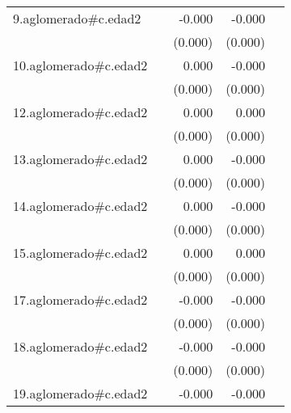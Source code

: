 {\begin{longtable}{l*{4}{D{.}{.}{-1}}}
\addlinespace
9.aglomerado#c.edad2&                     &      -0.000\sym{*}  &      -0.000\sym{***}&                     \\
            &                     &     (0.000)         &     (0.000)         &                     \\
\addlinespace
10.aglomerado#c.edad2&                     &       0.000         &      -0.000         &                     \\
            &                     &     (0.000)         &     (0.000)         &                     \\
\addlinespace
12.aglomerado#c.edad2&                     &       0.000\sym{*}  &       0.000         &                     \\
            &                     &     (0.000)         &     (0.000)         &                     \\
\addlinespace
13.aglomerado#c.edad2&                     &       0.000         &      -0.000\sym{***}&                     \\
            &                     &     (0.000)         &     (0.000)         &                     \\
\addlinespace
14.aglomerado#c.edad2&                     &       0.000         &      -0.000         &                     \\
            &                     &     (0.000)         &     (0.000)         &                     \\
\addlinespace
15.aglomerado#c.edad2&                     &       0.000         &       0.000         &                     \\
            &                     &     (0.000)         &     (0.000)         &                     \\
\addlinespace
17.aglomerado#c.edad2&                     &      -0.000         &      -0.000\sym{*}  &                     \\
            &                     &     (0.000)         &     (0.000)         &                     \\
\addlinespace
18.aglomerado#c.edad2&                     &      -0.000         &      -0.000\sym{*}  &                     \\
            &                     &     (0.000)         &     (0.000)         &                     \\
\addlinespace
19.aglomerado#c.edad2&                     &      -0.000         &      -0.000         &                     \\

\end{longtable}}
